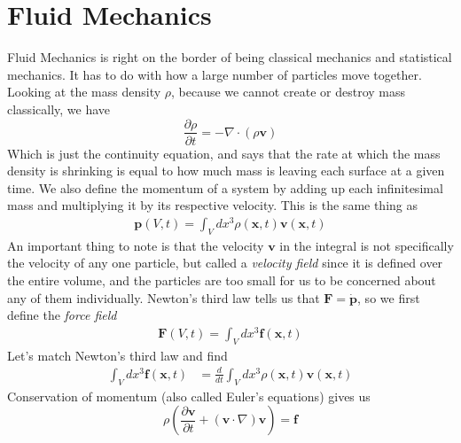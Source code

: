 \section{Fluid Mechanics}
Fluid Mechanics is right on the border of being classical mechanics and statistical mechanics. It has to do with how a large number of particles move together. Looking at the mass density $\rho$, because we cannot create or destroy mass classically, we have
\begin{equation}\label{masscon}
\frac{\partial\rho}{\partial t} = -\nabla\cdot (\rho\textbf{v})
\end{equation}
Which is just the continuity equation, and says that the rate at which the mass density is shrinking is equal to how much mass is leaving each surface at a given time. We also define the momentum of a system by adding up each infinitesimal mass and multiplying it by its respective velocity. This is the same thing as 
\begin{align}
    \textbf{p}(V,t) = \int_V dx^3 \rho(\textbf{x},t)\textbf{v}(\textbf{x},t)
\end{align}
An important thing to note is that the velocity $\textbf{v}$ in the integral is not specifically the velocity of any one particle, but called a \emph{velocity field} since it is defined over the entire volume, and the particles are too small for us to be concerned about any of them individually. Newton's third law tells us that $\textbf{F} = \dot{\textbf{p}}$, so we first define the \emph{force field}
\begin{align}
    \textbf{F}(V,t) = \int_V dx^3 \textbf{f}(\textbf{x},t)
\end{align}
Let's match Newton's third law and find
\begin{align}
    \int_V dx^3 \textbf{f}(\textbf{x},t) &= \frac{d}{dt}\int_V dx^3 \rho(\textbf{x},t)\textbf{v}(\textbf{x},t)
\end{align}
Conservation of momentum (also called Euler's equations) gives us
\begin{equation}\label{momcon}
\rho\left({\frac{\partial\textbf{v}}{\partial t} + (\textbf{v}\cdot\nabla)\textbf{v}}\right) = \textbf{f}
\end{equation}
%
%

